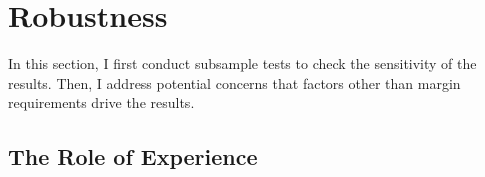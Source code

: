 \documentclass[12pt]{article}
\begin{document}
\section{Robustness}\label{sec:robust}

In this section, I first conduct subsample tests to check the sensitivity of the results. Then, I address potential concerns that factors other than margin requirements drive the results. 

\subsection{The Role of Experience}


\end{document}
